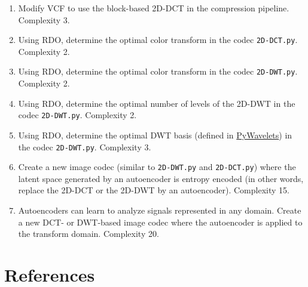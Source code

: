 \begin{enumerate}
\item Modify VCF to use the block-based 2D-DCT in the compression
  pipeline. Complexity 3.
\item Using RDO, determine the optimal color transform in the codec
  \texttt{2D-DCT.py}. Complexity 2.
\item Using RDO, determine the optimal color transform in the codec
  \texttt{2D-DWT.py}. Complexity 2.
\item Using RDO, determine the optimal number of levels of the 2D-DWT
  in the codec \texttt{2D-DWT.py}. Complexity 2.
\item Using RDO, determine the optimal DWT basis (defined in
  \href{https://pywavelets.readthedocs.io/en/latest/}{PyWavelets}) in
  the codec \texttt{2D-DWT.py}. Complexity 3.
\item Create a new image codec (similar to \texttt{2D-DWT.py} and
  \texttt{2D-DCT.py}) where the latent space generated by an
  autoencoder is entropy encoded (in other words, replace the 2D-DCT
  or the 2D-DWT by an autoencoder). Complexity 15.
\item Autoencoders can learn to analyze signals represented in any
  domain. Create a new DCT- or DWT-based image codec where the
  autoencoder is applied to the transform domain. Complexity 20.
\end{enumerate}


\section{References}

\renewcommand{\addcontentsline}[3]{}%



